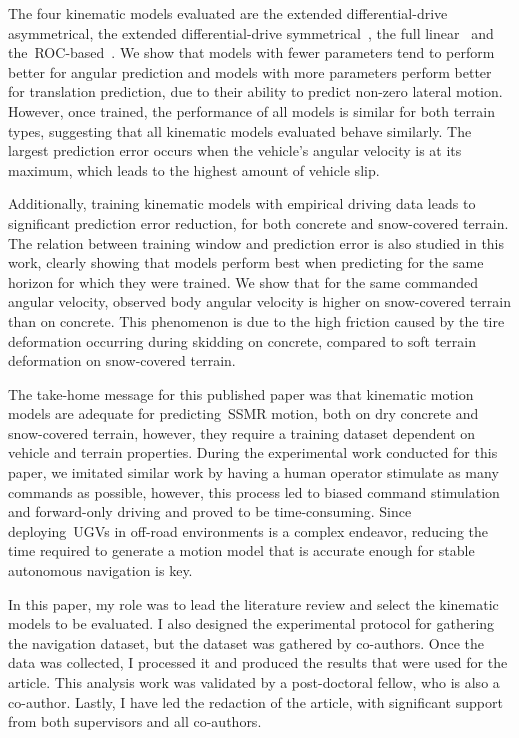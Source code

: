 \documentclass[12pt,letterpaper,oneside]{article}
\begin{document}
The four kinematic models evaluated are the extended differential-drive asymmetrical, the extended differential-drive symmetrical~\citep{Mandow2007}, the full linear~\citep{Anousaki2004} and the~\ac{ROC}-based~\citep{Wang2015}.
We show that models with fewer parameters tend to perform better for angular prediction and models with more parameters perform better for translation prediction, due to their ability to predict non-zero lateral motion.
However, once trained, the performance of all models is similar for both terrain types, suggesting that all kinematic models evaluated behave similarly.
The largest prediction error occurs when the vehicle's angular velocity is at its maximum, which leads to the highest amount of vehicle slip.

Additionally, training kinematic models with empirical driving data leads to significant prediction error reduction, for both concrete and snow-covered terrain.
The relation between training window and prediction error is also studied in this work, clearly showing that models perform best when predicting for the same horizon for which they were trained.
We show that for the same commanded angular velocity, observed body angular velocity is higher on snow-covered terrain than on concrete. 
This phenomenon is due to the high friction caused by the tire deformation occurring during skidding on concrete, compared to soft terrain deformation on snow-covered terrain.

The take-home message for this published paper was that kinematic motion models are adequate for predicting~\ac{SSMR} motion, both on dry concrete and snow-covered terrain, however, they require a training dataset dependent on vehicle and terrain properties.
During the experimental work conducted for this paper, we imitated similar work by having a human operator stimulate as many commands as possible, however, this process led to biased command stimulation and forward-only driving and proved to be time-consuming.
Since deploying~\acp{UGV} in off-road environments is a complex endeavor, reducing the time required to generate a motion model that is accurate enough for stable autonomous navigation is key.

In this paper, my role was to lead the literature review and select the kinematic models to be evaluated.
I also designed the experimental protocol for gathering the navigation dataset, but the dataset was gathered by co-authors.
Once the data was collected, I processed it and produced the results that were used for the article.
This analysis work was validated by a post-doctoral fellow, who is also a co-author. 
Lastly, I have led the redaction of the article, with significant support from both supervisors and all co-authors.
\\ \\
	\textbf{}
\end{document}
